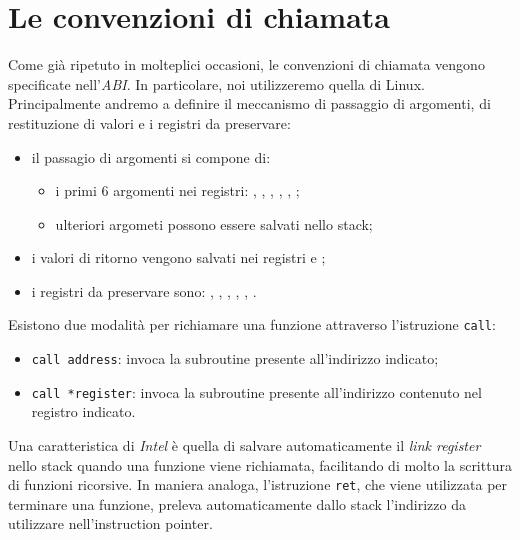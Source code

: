 \documentclass[class=book, crop=false, oneside]{standalone}
\begin{document}
\section{Le convenzioni di chiamata}
Come già ripetuto in molteplici occasioni, le convenzioni di chiamata vengono specificate nell'\emph{ABI}. In particolare, noi utilizzeremo quella di Linux. Principalmente andremo a definire il meccanismo di passaggio di argomenti, di restituzione di valori e i registri da preservare:
\begin{itemize}
	\item il passagio di argomenti si compone di:
	\begin{itemize}
		\item i primi \(6\) argomenti nei registri: , , , , , ;
		\item ulteriori argometi possono essere salvati nello stack;
	\end{itemize}
	\item i valori di ritorno vengono salvati nei registri  e ;
	\item i registri da preservare sono: , , , , , .
\end{itemize}

Esistono due modalità per richiamare una funzione attraverso l'istruzione \texttt{call}:
\begin{itemize}
	\item \texttt{call address}: invoca la subroutine presente all'indirizzo indicato;
	\item \texttt{call *register}: invoca la subroutine presente all'indirizzo contenuto nel registro indicato.
\end{itemize}
Una caratteristica di \emph{Intel} è quella di salvare automaticamente il \emph{link register} nello stack quando una funzione viene richiamata, facilitando di molto la scrittura di funzioni ricorsive. In maniera analoga, l'istruzione \texttt{ret}, che viene utilizzata per terminare una funzione, preleva automaticamente dallo stack l'indirizzo da utilizzare nell'instruction pointer.
\end{document}
